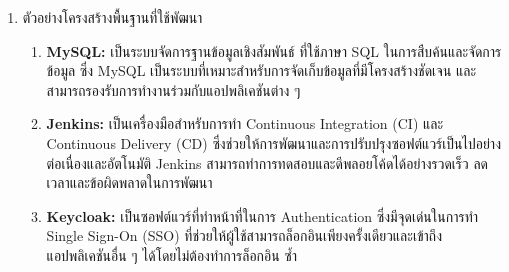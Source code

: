 \begin{enumerate}
\begin{enumerate}
\begin{enumerate}
        \end{enumerate}
    \end{enumerate}
    \item ตัวอย่างโครงสร้างพื้นฐานที่ใช้พัฒนา
    \begin{enumerate}
        \item \textbf{MySQL:} เป็นระบบจัดการฐานข้อมูลเชิงสัมพันธ์ ที่ใช้ภาษา SQL ในการสืบค้นและจัดการข้อมูล ซึ่ง MySQL เป็นระบบที่เหมาะสำหรับการจัดเก็บข้อมูลที่มีโครงสร้างชัดเจน และสามารถรองรับการทำงานร่วมกับแอปพลิเคชันต่าง ๆ
        \item \textbf{Jenkins:} เป็นเครื่องมือสำหรับการทำ Continuous Integration (CI) และ Continuous Delivery (CD) ซึ่งช่วยให้การพัฒนาและการปรับปรุงซอฟต์แวร์เป็นไปอย่างต่อเนื่องและอัตโนมัติ Jenkins สามารถทำการทดสอบและดีพลอยโค้ดได้อย่างรวดเร็ว ลดเวลาและข้อผิดพลาดในการพัฒนา
        \item \textbf{Keycloak: } เป็นซอฟต์แวร์ที่ทําหน้าที่ในการ Authentication ซึ่งมีจุดเด่นในการทํา Single Sign-On
        (SSO) ที่ช่วยให้ผู้ใช้สามารถล็อกอินเพียงครั้งเดียวและเข้าถึงแอปพลิเคชันอื่น ๆ ได้โดยไม่ต้องทําการล็อกอิน
        ซํ้า 
    \end{enumerate}
\end{enumerate}